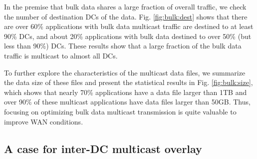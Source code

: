 In the premise that bulk data shares a large fraction of overall traffic, we check the number of destination DCs of the data. Fig. \ref{fig:bulk:dest} shows that there are over 60\% applications with bulk data multicast traffic are destined to at least 90\% DCs, and about 20\% applications with bulk data destined to over 50\% (but less than 90\%) DCs. These results show that a large fraction of the bulk data traffic is multicast to almost all DCs.

To further explore the characteristics of the multicast data files, we summarize the data size of these files and present the statistical results in Fig. \ref{fig:bulk:size}, which shows that nearly 70\% applications have a data file larger than 1TB and over 90\% of these multicast applications have data files larger than 50GB. Thus, focusing on optimizing bulk data multicast transmission is quite valuable to improve WAN conditions.

%
%
%
%

\subsection{A case for inter-DC multicast overlay}
\label{subsec:motivation:case-for}

